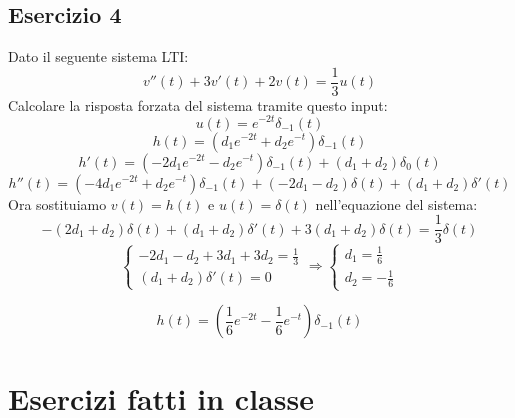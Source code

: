\documentclass[a4paper]{article}
\begin{document}
\subsection{Esercizio 4}

Dato il seguente sistema LTI:
\[v''(t) + 3v'(t) + 2v(t) = \frac{1}{3}u(t)\]
Calcolare la risposta forzata del sistema tramite questo input:
\[u(t) = e^{-2t}\delta_{-1}(t)\]
\[h(t) = (d_1e^{-2t} + d_2e^{-t})\delta_{-1}(t)\]
\[h'(t) = (-2d_1e^{-2t} - d_2e^{-t})\delta_{-1}(t) +(d_1 + d_2)\delta_0(t)\]
\[h''(t) = (-4d_1e^{-2t} + d_2e^{-t})\delta_{-1}(t) + (-2d_1 - d_2)\delta(t) + (d_1 + d_2)\delta'(t) \]
Ora sostituiamo $v(t) = h(t)$ e $u(t) = \delta(t)$ nell'equazione del sistema:
\[-(2d_1 + d_2)\delta(t) + (d_1 + d_2)\delta'(t) + 3(d_1 + d_2)\delta(t) = \frac{1}{3}\delta(t)\]
\[\begin{cases}
    - 2d_1 - d_2 + 3d_1 + 3d_2 = \frac{1}{3}\\
    (d_1 + d_2)\delta'(t) = 0
\end{cases} \Longrightarrow 
\begin{cases}
    d_1 = \frac{1}{6}\\
    d_2 = -\frac{1}{6}
\end{cases}
\]


\[h(t) = \left(\frac{1}{6}e^{-2t} - \frac{1}{6}e^{-t}\right)\delta_{-1}(t)\]
\pagebreak
\section{Esercizi fatti in classe}
\end{document}
